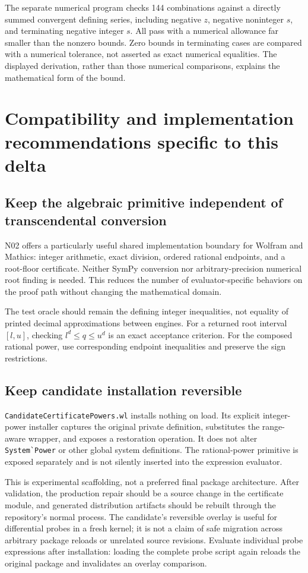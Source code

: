 \documentclass[11pt,a4paper]{article}
\newcommand{\code}[1]{\nolinkurl{#1}}
\begin{document}
The separate numerical program checks 144 combinations against a directly summed convergent defining series, including negative $z$, negative noninteger $s$, and terminating negative integer $s$. All pass with a numerical allowance far smaller than the nonzero bounds. Zero bounds in terminating cases are compared with a numerical tolerance, not asserted as exact numerical equalities. The displayed derivation, rather than those numerical comparisons, explains the mathematical form of the bound.

\section{Compatibility and implementation recommendations specific to this delta}
\subsection{Keep the algebraic primitive independent of transcendental conversion}

N02 offers a particularly useful shared implementation boundary for Wolfram and Mathics: integer arithmetic, exact division, ordered rational endpoints, and a root-floor certificate. Neither SymPy conversion nor arbitrary-precision numerical root finding is needed. This reduces the number of evaluator-specific behaviors on the proof path without changing the mathematical domain.

The test oracle should remain the defining integer inequalities, not equality of printed decimal approximations between engines. For a returned root interval $[l,u]$, checking $l^d\le q\le u^d$ is an exact acceptance criterion. For the composed rational power, use corresponding endpoint inequalities and preserve the sign restrictions.

\subsection{Keep candidate installation reversible}

\code{CandidateCertificatePowers.wl} installs nothing on load. Its explicit integer-power installer captures the original private definition, substitutes the range-aware wrapper, and exposes a restoration operation. It does not alter \code{System`Power} or other global system definitions. The rational-power primitive is exposed separately and is not silently inserted into the expression evaluator.

This is experimental scaffolding, not a preferred final package architecture. After validation, the production repair should be a source change in the certificate module, and generated distribution artifacts should be rebuilt through the repository's normal process. The candidate's reversible overlay is useful for differential probes in a fresh kernel; it is not a claim of safe migration across arbitrary package reloads or unrelated source revisions. Evaluate individual probe expressions after installation: loading the complete probe script again reloads the original package and invalidates an overlay comparison.
\end{document}
